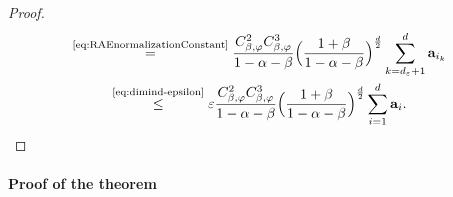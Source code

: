 \begin{proof}
\begin{multline}
        \overset{\text{\ref{eq:RAEnormalizationConstant}}}{=} \frac{C^2_{\beta,\varphi} C^3_{\beta,\varphi}}{1 - \alpha - \beta} \Bigl(\frac{1 + \beta}{1 - \alpha - \beta} \Bigr)^{\frac{d}{2}}\sum_{k=d_\varepsilon+1}^{d}\mathbf{a}_{i_k}  \\
        \overset{\text{\ref{eq:dimind-epsilon}}}{\leq} \varepsilon \frac{C^2_{\beta,\varphi} C^3_{\beta,\varphi}}{1 - \alpha - \beta} \Bigl(\frac{1 + \beta}{1 - \alpha - \beta} \Bigr)^{\frac{d}{2}} \sum_{i=1}^{d} \mathbf{a}_{i}.
    \end{multline}
\end{proof}

\paragraph{Proof of the theorem}

